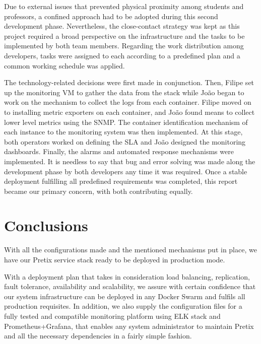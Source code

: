\documentclass[12pt]{article}
\begin{document}

Due to external issues that prevented physical proximity among students and professors, a confined approach had to be adopted during this second development phase.
Nevertheless, the close-contact strategy was kept as this project required a broad perspective on the infrastructure and the tasks to be implemented by both team members.
Regarding the work distribution among developers, tasks were assigned to each according to a predefined plan and a common working schedule was applied.

The technology-related decisions were first made in conjunction.
Then, Filipe set up the monitoring VM to gather the data from the stack while João began to work on the mechanism to collect the logs from each container.
Filipe moved on to installing metric exporters on each container, and João found means to collect lower level metrics using the SNMP.
The container identification mechanism of each instance to the monitoring system was then implemented.
At this stage, both operators worked on defining the SLA and João designed the monitoring dashboards.
Finally, the alarms and automated response mechanisms were implemented.
It is needless to say that bug and error solving was made along the development phase by both developers any time it was required.
Once a stable deployment fulfilling all predefined requirements was completed, this report became our primary concern, with both contributing equally.

\section*{Conclusions} \label{conclusions} %
With all the configurations made and the mentioned mechanisms put in place, we have our Pretix service stack ready to be deployed in production mode.

With a deployment plan that takes in consideration load balancing, replication, fault tolerance, availability and scalability, we assure with certain confidence that our system infrastructure can be deployed in any Docker Swarm and fulfils all production requisites. In addition, we also supply the configuration files for a fully tested and compatible monitoring platform using ELK stack and Prometheus+Grafana, that enables any system administrator to maintain Pretix and all the necessary dependencies in a fairly simple fashion.
\end{document}
